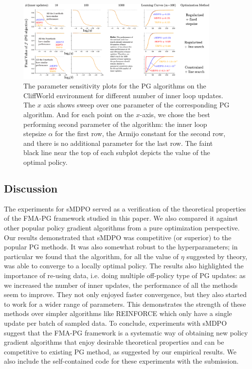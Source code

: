 \documentclass[a4paper, 10pt]{article}
\begin{document}
\begin{figure}[t]
    \centering
    \includegraphics[width=0.9\textwidth]{deep_sea_treasure_ablation.pdf}
    \caption{The parameter sensitivity plots for the  PG algorithms on the CliffWorld environment for different number of inner loop updates. The $x$ axis shows sweep over one parameter of the corresponding PG algorithm. And for each point on the $x$-axis, we chose the best performing second parameter of the algorithm: the inner loop stepsize $\alpha$ for the first row, the Armijo constant for the second row, and there is no additional parameter for the last row. The faint black line near the top of each subplot depicts the value of the optimal policy.
    \label{fig:dst_sensitivity_plots}}
\end{figure}

\subsection{Discussion} 
The experiments for sMDPO served as a verification of the theoretical properties of the FMA-PG framework studied in this paper. We also compared it against other popular policy gradient algorithms from a pure optimization perspective. Our results demonstrated that sMDPO was competitive (or superior) to the popular PG methods. It was also somewhat robust to the hyperparameters; in particular we found that the algorithm, for all the value of $\eta$ suggested by theory, was able to converge to a locally optimal policy. The results also highlighted the importance of re-using data, i.e. doing multiple off-policy type of PG updates: as we increased the number of inner updates, the performance of all the methods seem to improve. They not only enjoyed faster convergence, but they also started to work for a wider range of parameters. This demonstrates the strength of these methods over simpler algorithms like REINFORCE \citep{williams1992simple} which only have a single update per batch of sampled data. To conclude, experiments with sMDPO suggest that the FMA-PG framework is a systematic way of obtaining new policy gradient algorithms that enjoy desirable theoretical properties and can be competitive to existing PG method, as suggested by our empirical results. We also include the self-contained code for these experiments with the submission.
\end{document}
